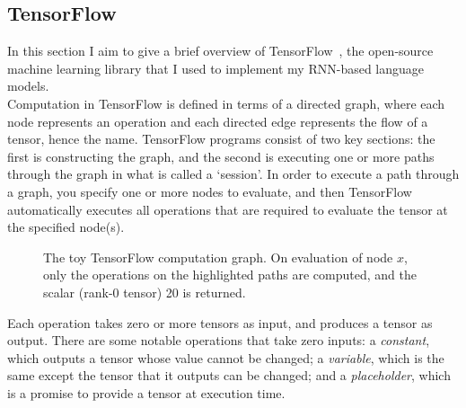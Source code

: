 \documentclass[a4paper, 12pt]{report}
\newcommand{\ttt}[1]{\texttt{#1}}
\newcommand{\tit}[1]{\textit{#1}}
\begin{document}
\subsection{TensorFlow} \label{tensorflow}

In this section I aim to give a brief overview of TensorFlow~\cite{tensorflow:abadi2016}, the open-source machine learning library that I used to implement my RNN-based language models. \\

Computation in TensorFlow is defined in terms of a directed graph, where each node represents an operation and each directed edge represents the flow of a tensor, hence the name. TensorFlow programs consist of two key sections: the first is constructing the graph, and the second is executing one or more paths through the graph in what is called a `session'. In order to execute a path through a graph, you specify one or more nodes to evaluate, and then TensorFlow automatically executes all operations that are required to evaluate the tensor at the specified node(s). \\

\begin{figure}[h]
\captionsetup{justification=centering}
\centering
{}
\caption{The toy TensorFlow computation graph. On evaluation of node $x$, only the operations on the highlighted paths are computed, and the scalar (rank-0 tensor) 20 is returned.}
\label{fig:tensorflow}
\end{figure}
Each operation takes zero or more tensors as input, and produces a tensor as output. There are some notable operations that take zero inputs: a \tit{constant}, which outputs a tensor whose value cannot be changed; a \tit{variable}, which is the same except the tensor that it outputs can be changed; and a \tit{placeholder}, which is a promise to provide a tensor at execution time. \\
\end{document}
